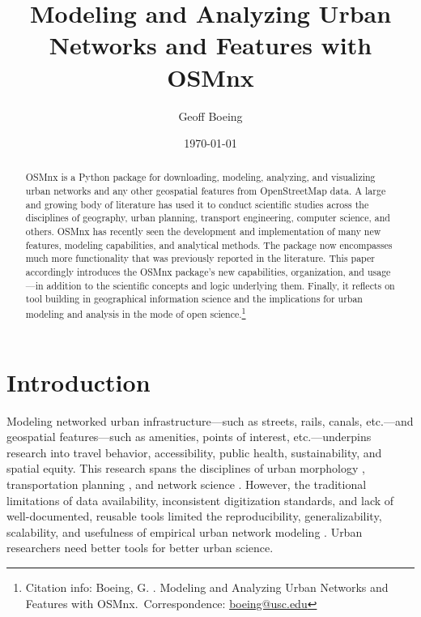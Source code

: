 \documentclass[12pt,letterpaper]{article} %
\makeatletter
\newcommand{\myname}{Geoff Boeing}
\newcommand{\myemail}{boeing@usc.edu}
\newcommand{\myaffiliation}{University of Southern California}
\newcommand{\paperdate}{\monthyeardate\today}
\newcommand{\papertitle}{Modeling and Analyzing Urban Networks and Features with OSMnx}
\newcommand{\papercitation}{Boeing, G. \the\year. \papertitle.}
\makeatother
\begin{document}
\title{\papertitle}
\author[]{\myname}
\affil[]{\myaffiliation}
\date{\paperdate}

\maketitle

\begin{abstract}

OSMnx is a Python package for downloading, modeling, analyzing, and visualizing urban networks and any other geospatial features from OpenStreetMap data. A large and growing body of literature has used it to conduct scientific studies across the disciplines of geography, urban planning, transport engineering, computer science, and others. OSMnx has recently seen the development and implementation of many new features, modeling capabilities, and analytical methods. The package now encompasses much more functionality that was previously reported in the literature. This paper accordingly introduces the OSMnx package's new capabilities, organization, and usage---in addition to the scientific concepts and logic underlying them. Finally, it reflects on tool building in geographical information science and the implications for urban modeling and analysis in the mode of open science.\footnote{Citation info: \papercitation~Correspondence: \href{mailto:\myemail}{\myemail}}

\end{abstract}

\section{Introduction}

Modeling networked urban infrastructure---such as streets, rails, canals, etc.---and geospatial features---such as amenities, points of interest, etc.---underpins research into travel behavior, accessibility, public health, sustainability, and spatial equity. This research spans the disciplines of urban morphology \citep[e.g.,][]{gervasoni_calculating_2017,dacci_signature_2019,coutrot_cities_2020}, transportation planning \citep[e.g.,][]{merchan_quantifying_2020,liao_disparities_2020,natera_orozco_data-driven_2019}, and network science \citep[e.g.,][]{feng_spatial_2020,yin_multi-task_2020,young_automatic_2020}. However, the traditional limitations of data availability, inconsistent digitization standards, and lack of well-documented, reusable tools limited the reproducibility, generalizability, scalability, and usefulness of empirical urban network modeling \citep{liu_generalized_2021}. Urban researchers need better tools for better urban science.
\end{document}
